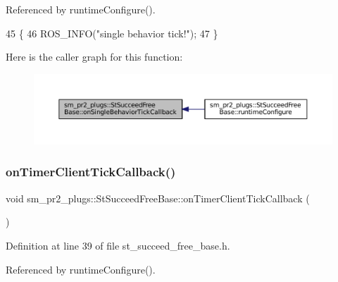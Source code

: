 Referenced by runtime\+Configure().


\begin{DoxyCode}
45     \{
46         ROS\_INFO(\textcolor{stringliteral}{"single behavior tick!"});
47     \}
\end{DoxyCode}
Here is the caller graph for this function\+:
\nopagebreak
\begin{figure}[H]
\begin{center}
\leavevmode
\includegraphics[width=350pt]{structsm__pr2__plugs_1_1StSucceedFreeBase_a18e063dd7dc924cd903824eaa2b680f7_icgraph}
\end{center}
\end{figure}
\mbox{\label{structsm__pr2__plugs_1_1StSucceedFreeBase_a53328e9b7c378014ba1d19b835808582}} 
\subsubsection{\texorpdfstring{on\+Timer\+Client\+Tick\+Callback()}{onTimerClientTickCallback()}}
{\footnotesize\ttfamily void sm\+\_\+pr2\+\_\+plugs\+::\+St\+Succeed\+Free\+Base\+::on\+Timer\+Client\+Tick\+Callback (\begin{DoxyParamCaption}{ }\end{DoxyParamCaption})\hspace{0.3cm}{\ttfamily [inline]}}



Definition at line 39 of file st\+\_\+succeed\+\_\+free\+\_\+base.\+h.



Referenced by runtime\+Configure().


